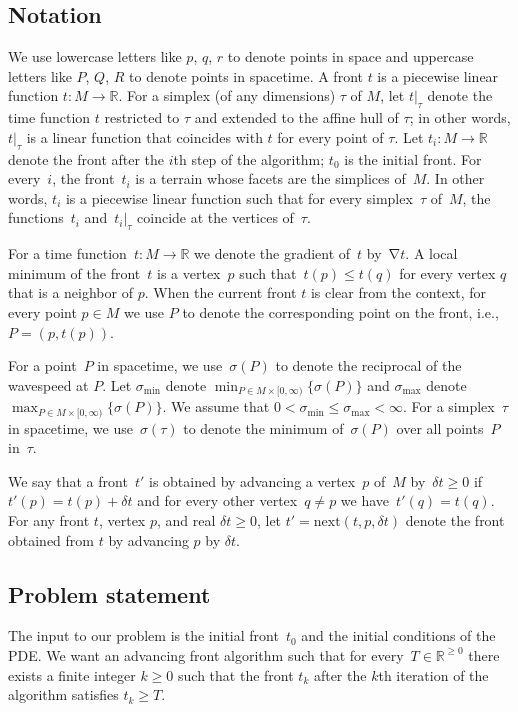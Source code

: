 \documentclass[twocolumn]{article}
\def\Real{\ensuremath{\mathbb{R}}}
\def\S{\ensuremath{\sigma}}
\def\minS{\ensuremath{\S_{\text{min}}}}
\def\maxS{\ensuremath{\S_{\text{max}}}}
\def\sp{\ensuremath{M}}
\def\p{\ensuremath{p}}
\def\fp{\ensuremath{P}}
\def\fq{\ensuremath{Q}}
\def\fr{\ensuremath{R}}
\DeclareMathOperator{\grad}{\ensuremath{\nabla}}
\def\dt{\ensuremath{\delta t}}
\def\rest#1#2{\ensuremath{\left. #1 \right|_{#2}}}
\def\next{\text{next}}
\begin{document}
\subsection{Notation}

We use lowercase letters like $p$, $q$, $r$ to denote points in space
and uppercase letters like $\fp$, $\fq$, $\fr$ to denote points in
spacetime.  A front $t$ is a piecewise linear function $t : \sp \to
\Real$.  For a simplex (of any dimensions) $\tau$ of $\sp$, let
$\rest{t}{\tau}$ denote the time function $t$ restricted to $\tau$ and
extended to the affine hull of $\tau$; in other words,
$\rest{t}{\tau}$ is a linear function that coincides with $t$ for
every point of $\tau$.  Let $t_i : \sp \to \Real$ denote the front after
the $i$th step of the algorithm; $t_0$ is the initial front.  For
every~$i$, the front~$t_i$ is a terrain whose facets are the simplices
of~$\sp$.  In other words, $t_i$ is a piecewise linear function such
that for every simplex~$\tau$ of~$M$, the functions~$t_i$
and~$\rest{t_i}{\tau}$ coincide at the vertices of~$\tau$.

For a time function~$t:\sp \to \Real$ we denote the gradient of~$t$
by~$\grad t$.  A local minimum of the front~$t$ is a vertex~$p$ such
that~$t(p) \le t(q)$ for every vertex $q$ that is a neighbor of $p$.
When the current front $t$ is clear from the context, for every point
$p \in \sp$ we use $\fp$ to denote the corresponding point on the
front, i.e., $\fp=(p,t(p))$.

For a point~$\fp$ in spacetime, we use~$\S(\fp)$ to denote the
reciprocal of the wavespeed at $\fp$.  Let $\minS$ denote $\min_{\fp
  \in \sp \times [0,\infty)} \{\S(\fp)\}$ and $\maxS$ denote
$\max_{\fp \in \sp \times [0,\infty)} \{\S(\fp)\}$.  We assume that $0
< \minS \le \maxS < \infty$.  For a simplex~$\tau$ in spacetime, we
use~$\S(\tau)$ to denote the minimum of~$\S(\fp)$ over all
points~$\fp$ in~$\tau$.

We say that a front~$t'$ is obtained by advancing a vertex~$p$ of~$M$
by~$\dt \ge 0$ if~$t'(p) = t(p) + \dt$ and for every other vertex~$q
\ne p$ we have~$t'(q) = t(q)$.  For any front $t$, vertex $\p$, and
real $\dt \ge 0$, let $t'=\next(t,\p,\dt)$ denote the front obtained
from $t$ by advancing $\p$ by $\dt$.


\subsection{Problem statement}

The input to our problem is the initial front~$t_0$ and the initial
conditions of the PDE.  We want an advancing front algorithm such that
for every~$T \in \Real^{\ge 0}$ there exists a finite integer $k \ge 0$
such that the front $t_k$ after the $k$th iteration of the algorithm
satisfies $t_k \ge T$.
\end{document}
